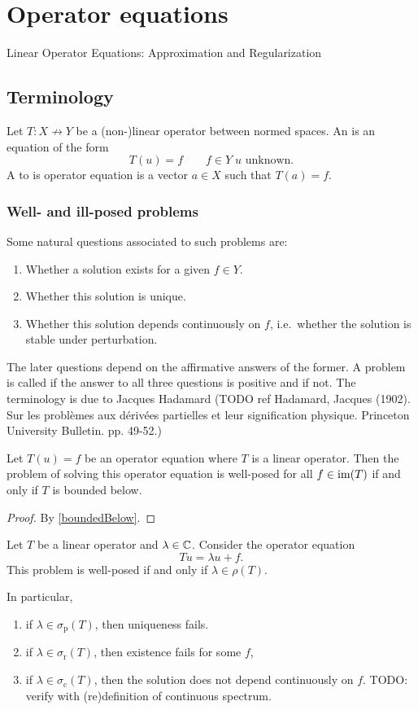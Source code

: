 \chapter{Operator equations}
Linear Operator Equations: Approximation and Regularization
\section{Terminology}
\begin{definition}
Let $T: X\not\to Y$ be a (non-)linear operator between normed spaces. An  is an equation of the form
\[ T(u) = f \qquad f\in Y\; \text{$u$ unknown.} \]
A  to is operator equation is a vector $a\in X$ such that $T(a) = f$.
\end{definition}
\subsection{Well- and ill-posed problems}
Some natural questions associated to such problems are:
\begin{enumerate}
\item Whether a solution exists for a given $f\in Y$.
\item Whether this solution is unique.
\item Whether this solution depends continuously on $f$, i.e.\ whether the solution is stable under perturbation.
\end{enumerate}
The later questions depend on the affirmative answers of the former. A problem is called  if the answer to all three questions is positive and  if not. The terminology is due to Jacques Hadamard (TODO ref Hadamard, Jacques (1902). Sur les problèmes aux dérivées partielles et leur signification physique. Princeton University Bulletin. pp. 49-52.)

\begin{proposition}
Let $ T(u) = f$ be an operator equation where $T$ is a linear operator. Then the problem of solving this operator equation is well-posed for all $f\in\operatorname{im}(T)$ \textup{if and only if} $T$ is bounded below.
\end{proposition}
\begin{proof}
By \ref{boundedBelow}.
\end{proof}

\begin{proposition}
Let $T$ be a linear operator and $\lambda \in \mathbb{C}$. Consider the operator equation
\[  Tu = \lambda u + f. \]
This problem is well-posed if and only if $\lambda\in \rho(T)$.

In particular, 
\begin{enumerate}
\item if $\lambda\in\sigma_\text{p}(T)$, then uniqueness fails.
\item if $\lambda\in\sigma_\text{r}(T)$, then existence fails for some $f$,
\item if $\lambda\in\sigma_\text{c}(T)$, then the solution does not depend continuously on $f$. TODO: verify with (re)definition of continuous spectrum.
\end{enumerate}
\end{proposition}

